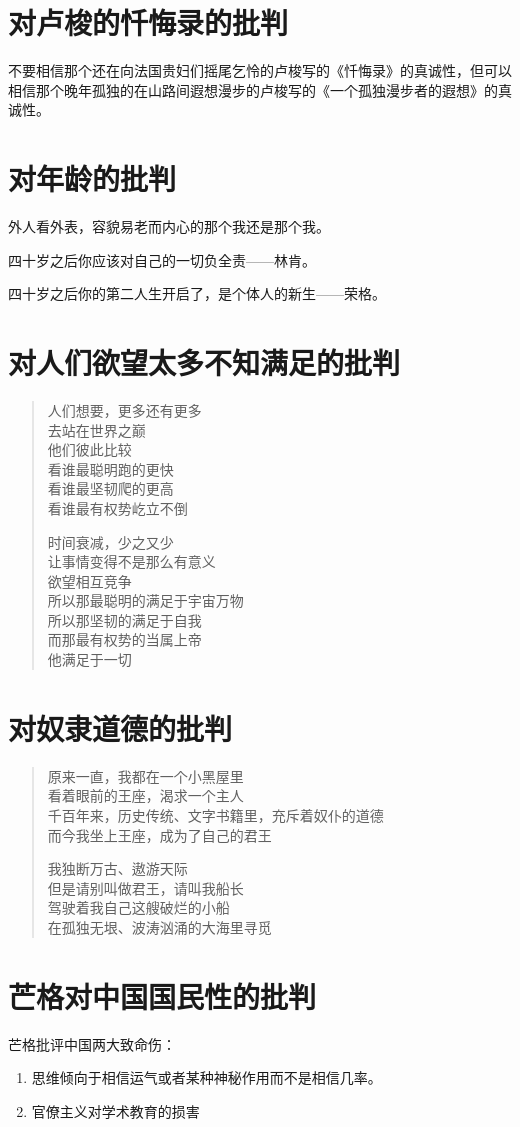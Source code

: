 \documentclass[12pt,oneside]{book}
\newenvironment{shici}{
\begin{verse}
\centering\large\hspace{12pt}}
{\end{verse}}
\begin{document}
\chapter{对卢梭的忏悔录的批判}
不要相信那个还在向法国贵妇们摇尾乞怜的卢梭写的《忏悔录》的真诚性，但可以相信那个晚年孤独的在山路间遐想漫步的卢梭写的《一个孤独漫步者的遐想》的真诚性。

\chapter{对年龄的批判}
外人看外表，容貌易老而内心的那个我还是那个我。

四十岁之后你应该对自己的一切负全责——林肯。

四十岁之后你的第二人生开启了，是个体人的新生——荣格。


\chapter{对人们欲望太多不知满足的批判}
\begin{shici}
人们想要，更多还有更多\\
去站在世界之巅\\
他们彼此比较\\
看谁最聪明跑的更快\\
看谁最坚韧爬的更高\\
看谁最有权势屹立不倒

时间衰减，少之又少\\
让事情变得不是那么有意义\\
欲望相互竞争\\
所以那最聪明的满足于宇宙万物\\
所以那坚韧的满足于自我\\
而那最有权势的当属上帝\\
他满足于一切
\end{shici}



\chapter{对奴隶道德的批判}
\begin{shici}
原来一直，我都在一个小黑屋里\\
看着眼前的王座，渴求一个主人\\
千百年来，历史传统、文字书籍里，充斥着奴仆的道德\\
而今我坐上王座，成为了自己的君王 

我独断万古、遨游天际\\
但是请别叫做君王，请叫我船长\\
驾驶着我自己这艘破烂的小船\\
在孤独无垠、波涛汹涌的大海里寻觅 
\end{shici}

\chapter{芒格对中国国民性的批判}
芒格批评中国两大致命伤：

\begin{enumerate}
\item 思维倾向于相信运气或者某种神秘作用而不是相信几率。
\item 官僚主义对学术教育的损害
\end{enumerate}
\end{document}
